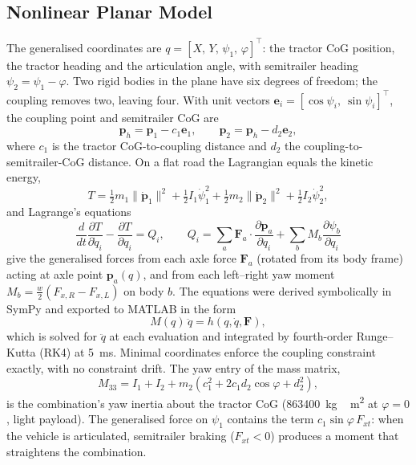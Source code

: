 \documentclass[conference]{IEEEtran}
\begin{document}
\subsection{Nonlinear Planar Model}
The generalised coordinates are $q=[X,\,Y,\,\psi_1,\,\varphi]^\top$: the tractor CoG position, the tractor heading and the articulation angle, with semitrailer heading $\psi_2=\psi_1-\varphi$. Two rigid bodies in the plane have six degrees of freedom; the coupling removes two, leaving four. With unit vectors $\mathbf e_i=[\cos\psi_i,\ \sin\psi_i]^\top$, the coupling point and semitrailer CoG are
\begin{equation}
\mathbf p_h=\mathbf p_1-c_1\mathbf e_1,\qquad \mathbf p_2=\mathbf p_h-d_2\mathbf e_2,
\end{equation}
where $c_1$ is the tractor CoG-to-coupling distance and $d_2$ the coupling-to-semitrailer-CoG distance. On a flat road the Lagrangian equals the kinetic energy,
\begin{equation}
T=\tfrac12 m_1\|\dot{\mathbf p}_1\|^2+\tfrac12 I_1\dot\psi_1^2+\tfrac12 m_2\|\dot{\mathbf p}_2\|^2+\tfrac12 I_2\dot\psi_2^2,
\end{equation}
and Lagrange's equations
\begin{equation}
\frac{d}{dt}\frac{\partial T}{\partial \dot q_i}-\frac{\partial T}{\partial q_i}=Q_i,\qquad
Q_i=\sum_a \mathbf F_a\cdot\frac{\partial \mathbf p_a}{\partial q_i}+\sum_b M_b\frac{\partial\psi_b}{\partial q_i}
\end{equation}
give the generalised forces from each axle force $\mathbf F_a$ (rotated from its body frame) acting at axle point $\mathbf p_a(q)$, and from each left--right yaw moment $M_b=\tfrac{w}{2}(F_{x,R}-F_{x,L})$ on body $b$. The equations were derived symbolically in SymPy and exported to MATLAB in the form
\begin{equation}
M(q)\,\ddot q=h(q,\dot q,\mathbf F),
\end{equation}
which is solved for $\ddot q$ at each evaluation and integrated by fourth-order Runge--Kutta (RK4) at \SI{5}{ms}. Minimal coordinates enforce the coupling constraint exactly, with no constraint drift. The yaw entry of the mass matrix,
\begin{equation}
M_{33}=I_1+I_2+m_2\left(c_1^2+2c_1d_2\cos\varphi+d_2^2\right),
\end{equation}
is the combination's yaw inertia about the tractor CoG (\SI{863400}{kg\,m^2} at $\varphi=0$, light payload). The generalised force on $\psi_1$ contains the term $c_1\sin\varphi\,F_{xt}$: when the vehicle is articulated, semitrailer braking ($F_{xt}<0$) produces a moment that straightens the combination.
\end{document}
